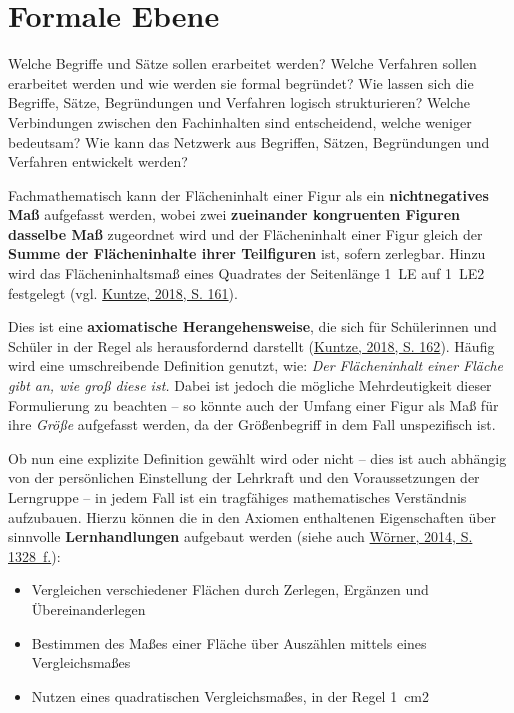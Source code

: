 \documentclass[
]{scrbook}
\providecommand{\tightlist}{%
  \setlength{\itemsep}{0pt}\setlength{\parskip}{0pt}}
\renewenvironment{quote}{
  \list{}{
	\leftmargin0.2cm   %
    \rightmargin\leftmargin
      	\def\FrameCommand
    {%
        {\color{quoteColor}\vrule width 2pt}%
        \hspace{0pt}%
    }%
    \MakeFramed{\advance \hsize -\width \FrameRestore}    \color{quoteColor}
    }
  \item\relax
}
{\endlist\color{black}\endMakeFramed}
\theoremstyle{definition}
\theoremstyle{definition}
\theoremstyle{definition}
\theoremstyle{definition}
\theoremstyle{remark}
\begin{document}
\hypertarget{formale-ebene-1}{%
\section{Formale Ebene}\label{formale-ebene-1}}

\begin{quote}
Welche Begriffe und Sätze sollen erarbeitet werden?
Welche Verfahren sollen erarbeitet werden und wie werden sie formal begründet?
Wie lassen sich die Begriffe, Sätze, Begründungen und Verfahren logisch strukturieren?
Welche Verbindungen zwischen den Fachinhalten sind entscheidend, welche weniger bedeutsam?
Wie kann das Netzwerk aus Begriffen, Sätzen, Begründungen und Verfahren entwickelt werden?
\end{quote}

Fachmathematisch kann der Flächeninhalt einer Figur als ein \textbf{nichtnegatives Maß} aufgefasst werden, wobei zwei \textbf{zueinander kongruenten Figuren dasselbe Maß} zugeordnet wird und der Flächeninhalt einer Figur gleich der \textbf{Summe der Flächeninhalte ihrer Teilfiguren} ist, sofern zerlegbar. Hinzu wird das Flächeninhaltsmaß eines Quadrates der Seitenlänge 1~LE auf 1~LE2 festgelegt (vgl. \protect\hyperlink{ref-Kuntze2018}{Kuntze, 2018, S. 161}).

Dies ist eine \textbf{axiomatische Herangehensweise}, die sich für Schülerinnen und Schüler in der Regel als herausfordernd darstellt (\protect\hyperlink{ref-Kuntze2018}{Kuntze, 2018, S. 162}). Häufig wird eine umschreibende Definition genutzt, wie: \emph{Der Flächeninhalt einer Fläche gibt an, wie groß diese ist.} Dabei ist jedoch die mögliche Mehrdeutigkeit dieser Formulierung zu beachten -- so könnte auch der Umfang einer Figur als Maß für ihre \emph{Größe} aufgefasst werden, da der Größenbegriff in dem Fall unspezifisch ist.

Ob nun eine explizite Definition gewählt wird oder nicht -- dies ist auch abhängig von der persönlichen Einstellung der Lehrkraft und den Voraussetzungen der Lerngruppe -- in jedem Fall ist ein tragfähiges mathematisches Verständnis aufzubauen. Hierzu können die in den Axiomen enthaltenen Eigenschaften über sinnvolle \textbf{Lernhandlungen} aufgebaut werden (siehe auch \protect\hyperlink{ref-Worner2014}{Wörner, 2014, S. 1328~f.}):

\begin{itemize}
\tightlist
\item
  Vergleichen verschiedener Flächen durch Zerlegen, Ergänzen und Übereinanderlegen
\item
  Bestimmen des Maßes einer Fläche über Auszählen mittels eines Vergleichsmaßes
\item
  Nutzen eines quadratischen Vergleichsmaßes, in der Regel 1~cm2
\end{itemize}
\end{document}
